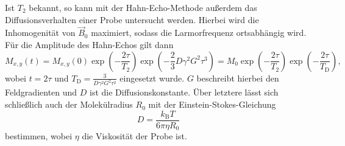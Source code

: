 Ist $T_2$ bekannt, so kann mit der Hahn-Echo-Methode außerdem das Diffusionsverhalten einer Probe untersucht werden. Hierbei wird die Inhomogenität von $\vec{B}_0$ maximiert, sodass die Larmorfrequenz ortsabhängig wird. Für die Amplitude des Hahn-Echos gilt dann
\begin{equation}
  M_{x,y} \left(t\right) = M_{x,y}\left(0\right) \exp \left(-\frac{2\tau}{T_2}\right) \exp \left(-\frac{2}{3} D \gamma^2 G^2 \tau^3\right) = M_0 \exp \left(-\frac{2\tau}{T_2}\right) \exp \left(-\frac{2\tau}{T_\mathrm{D}}\right),
  \label{eq:D}
\end{equation}
wobei $t = 2\tau$ und $T_\mathrm{D} = \frac{3}{D \gamma^2 G^2 \tau^2}$ eingesetzt wurde. $G$ beschreibt hierbei den Feldgradienten und $D$ ist die Diffusionskonstante. Über letztere lässt sich schließlich auch der Molekülradius $R_0$ mit der Einstein-Stokes-Gleichung
\begin{equation}
  D = \frac{k_\mathrm{B} T}{6\pi\eta R_0}
  \label{eq:R0}
\end{equation}
bestimmen, wobei $\eta$ die Viskosität der Probe ist.
